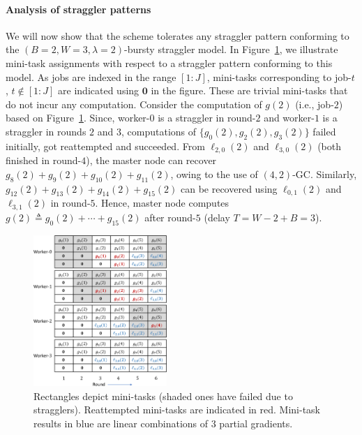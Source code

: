\paragraph{Analysis of straggler patterns} We will now show that the scheme tolerates any straggler pattern conforming to the $(B=2,W=3,\lambda=2)$-bursty straggler model. In Figure~\ref{ch2:fig:const_b_sgc_example}, we illustrate mini-task assignments with respect to a straggler pattern conforming to this model. As jobs are indexed in the range $[1:J]$,  mini-tasks corresponding to job-$t$, $t\notin[1:J]$ are indicated using $\mathbf{0}$ in the figure. These are trivial mini-tasks that do not incur any computation. Consider the computation of $g(2)$ (i.e., job-$2$) based on Figure~\ref{ch2:fig:const_b_sgc_example}. Since, worker-$0$ is a straggler in round-$2$ and worker-$1$ is a straggler in rounds $2$ and $3$, computations of $\{g_{0}(2),g_{2}(2),g_{3}(2)\}$ failed initially, got reattempted and succeeded. From $\ell_{2,0}(2)$ and  $\ell_{3,0}(2)$ (both finished in round-$4$),  the master node can recover  $g_{8}(2)+g_{9}(2)+g_{10}(2)+g_{11}(2)$, owing to the use of $(4,2)$-GC. Similarly, $g_{12}(2)+g_{13}(2)+g_{14}(2)+g_{15}(2)$ can be recovered using $\ell_{0,1}(2)$ and $\ell_{3,1}(2)$ in round-$5$. Hence, master node computes $g(2)\triangleq g_0(2)+\cdots+g_{15}(2)$ after round-$5$ (delay  $T=W-2+B=3$).

\begin{figure}
    \centering
    \includegraphics[width=0.45\textwidth]{figs/ch2/fig_B_SGC_example_mini_task_assignment_v2}
    \caption{
        Rectangles depict mini-tasks (shaded ones have failed due to stragglers).  Reattempted mini-tasks are indicated in red. Mini-task results in blue are linear combinations of $3$ partial gradients.
    }
    \label{ch2:fig:const_b_sgc_example}
\end{figure}

